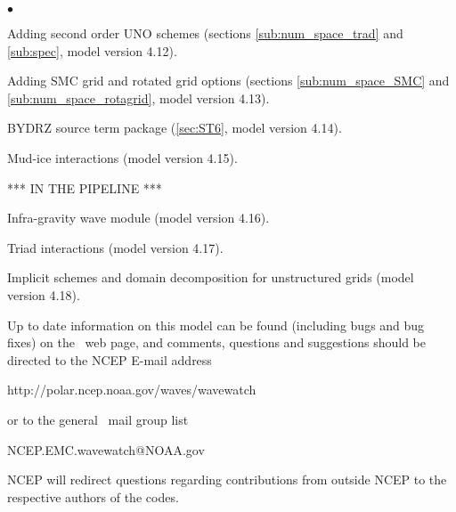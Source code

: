 \begin{list}{$\bullet$}{\rightmargin 5mm \parsep 0mm \itemsep 0mm}
\item Adding second order UNO schemes (sections \ref{sub:num_space_trad} and
  \ref{sub:spec}, model version 4.12).

\item Adding SMC grid and rotated grid options (sections
  \ref{sub:num_space_SMC} and \ref{sub:num_space_rotagrid}, model version
  4.13).

\item BYDRZ source term package (\para\ref{sec:ST6}, model version 4.14).

\item Mud-ice interactions (model version 4.15).

\vspace{\baselineskip}
\centerline{*** IN THE PIPELINE ***}
\vspace{\baselineskip}

\item Infra-gravity wave module (model version 4.16).

\item Triad interactions (model version 4.17).

\item Implicit schemes and domain decomposition for unstructured grids (model
  version 4.18).
\end{list}

\vspace{\baselineskip} \noindent 
Up to date information on this model can be found (including bugs and bug
fixes) on the \ws\ web page, and comments, questions and suggestions should be
directed to the NCEP E-mail address

\begin{center}
http://polar.ncep.noaa.gov/waves/wavewatch
\end{center}

\noindent
or to the general \ws\ mail group list

\begin{center}
NCEP.EMC.wavewatch@NOAA.gov
\end{center}

\noindent
NCEP will redirect questions regarding contributions from outside NCEP to the
respective authors of the codes.

